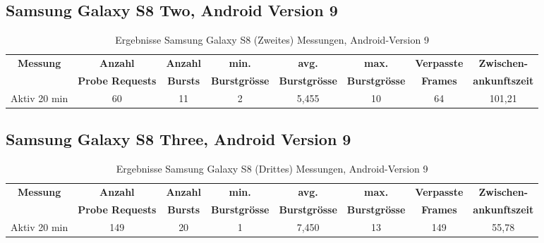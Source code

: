 \begin{landscape}
   \subsection*{Samsung Galaxy S8 Two, Android Version 9}
   \begin{table}[h!]
      \centering
      \begin{tabular}{|c|c|c|c|c|c|c|c|}
      \hline
      \textbf{Messung} & \textbf{Anzahl} & \textbf{Anzahl} & \textbf{min.} & \textbf{avg.} & \textbf{max.} & \textbf{Verpasste} & \textbf{Zwischen-}\\
      & \textbf{Probe Requests} & \textbf{Bursts} & \textbf{Burstgrösse} & \textbf{Burstgrösse} & \textbf{Burstgrösse} & \textbf{Frames} & \textbf{ankunftszeit}\\
      \hline
      Aktiv 20 min & 60 & 11 & 2 & 5,455 & 10 & 64 & 101,21 \\
      \hline
      \end{tabular}
      \caption{Ergebnisse Samsung Galaxy S8 (Zweites) Messungen, Android-Version 9
      \label{table:samsunggalaxys8-2-9-results}} 
   \end{table}
   
   \clearpage

   \subsection*{Samsung Galaxy S8 Three, Android Version 9}
   \begin{table}[h!]
      \centering
      \begin{tabular}{|c|c|c|c|c|c|c|c|}
      \hline
      \textbf{Messung} & \textbf{Anzahl} & \textbf{Anzahl} & \textbf{min.} & \textbf{avg.} & \textbf{max.} & \textbf{Verpasste} & \textbf{Zwischen-}\\
      & \textbf{Probe Requests} & \textbf{Bursts} & \textbf{Burstgrösse} & \textbf{Burstgrösse} & \textbf{Burstgrösse} & \textbf{Frames} & \textbf{ankunftszeit}\\
      \hline
      Aktiv 20 min & 149 & 20 & 1 & 7,450 & 13 & 149 & 55,78 \\
      \hline
      \end{tabular}
      \caption{Ergebnisse Samsung Galaxy S8 (Drittes) Messungen, Android-Version 9
      \label{table:samsunggalaxys8-3-9-results}} 
   \end{table}


\end{landscape}
